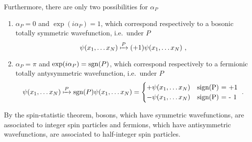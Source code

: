     Furthermore, there are only two possibilities for $\alpha_P$ 
    \begin{enumerate}
        \item $\alpha_P = 0$ and $\exp(i \alpha_P) = 1$, which correspond respectively to a bosonic totally symmetric wavefunction, i.e.~under $P$
        \begin{equation*}
            \psi(x_1, \ldots x_N) \xmapsto{P} (+ 1) \psi(x_1, \ldots x_N) ~,
        \end{equation*}
        \item $\alpha_P = \pi$ and $\exp(i \alpha_P) = \operatorname{sgn}(P)$, which correspond respectively to a fermionic totally antysymmetric wavefunction, i.e.~under $P$
        \begin{equation*}
            \psi(x_1, \ldots x_N) \xmapsto{P} \operatorname{sgn}(P) \psi(x_1, \ldots x_N) = \begin{cases}
                + \psi(x_1, \ldots x_N) & \textnormal{sign(P) = +1} \\
                - \psi(x_1, \ldots x_N) & \textnormal{sign(P) = - 1} \\
            \end{cases}~.
        \end{equation*}
    \end{enumerate}
    By the spin-statistic theorem, bosons, which have symmetric wavefunctions, are associated to integer spin particles and fermions, which have antisymmetric wavefunctions, are associated to half-integer spin particles.
